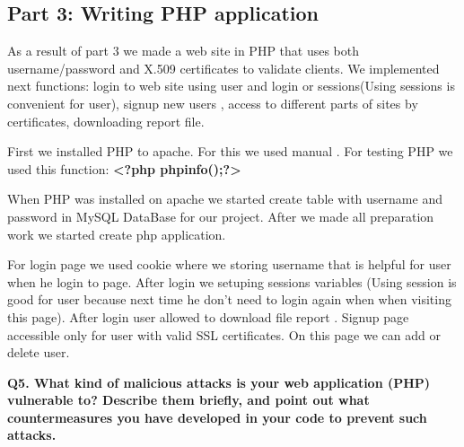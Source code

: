 \subsection {Part 3: Writing PHP application}


\noindent
As a result of part 3 we made a web site in PHP that uses both username/password and X.509 certificates to validate clients. We implemented next functions: login to web site using user and login or sessions(Using sessions is convenient for user), signup new users , access to different parts of sites by certificates, downloading report file.
\newline

\noindent
First we installed PHP to apache. For this  we used manual \cite {Quelle3}. For testing PHP we used this function: {\bf <?php phpinfo();?>}
\newline

\noindent
When PHP was installed on apache we started  create table  with username and password  in MySQL DataBase for our project. After we made all preparation work we started create php application. 
\newline

\noindent
For login page we used cookie where we storing username that is helpful for user when he login to page. After login we setuping sessions variables (Using session is good for user because next time he don’t need to login again when when visiting this page). After login user allowed to download file report . Signup page accessible  only for user with valid SSL certificates. On this page we can add or delete user.
\newline

\noindent
{\bf Q5. What kind of malicious attacks is your web application (PHP) vulnerable to? Describe them briefly, and point out what countermeasures you have
developed in your code to prevent such attacks.}
\newline










